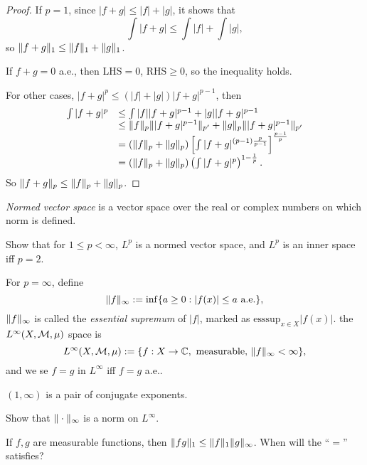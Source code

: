 \begin{proof}
    If $p=1$, since $|f+g|\le|f|+|g|$, it shows that 
    \begin{displaymath}
        \int|f+g|\le\int|f|+\int|g|,
    \end{displaymath}
    so $\|f+g\|_{1}\le\|f\|_{1}+\|g\|_{1}$.

    If $f+g=0$ a.e., then LHS$=0$, RHS$\ge 0$, so the inequality 
    holds. 

    For other cases, $|f+g|^{p}\le(|f|+|g|)|f+g|^{p-1}$, then 
    \begin{displaymath}
        \begin{array}{rl}
            \int|f+g|^{p}&\le \int|f||f+g|^{p-1}+|g||f+g|^{p-1}\\
            &\le\|f\|_{p}\||f+g|^{p-1}\|_{p'}
            +\|g\|_{p}\||f+g|^{p-1}\|_{p'}\\
            &=(\|f\|_{p}+\|g\|_{p})
            \left[\int|f+g|^{(p-1)\frac{p}{p-1}}\right]
            ^{\frac{p-1}{p}}\\
            &=(\|f\|_{p}+\|g\|_{p})
            \left(\int|f+g|^{p}\right)^{1-\frac{1}{p}}.
        \end{array}
    \end{displaymath}
    So $\|f+g\|_{p}\le\|f\|_{p}+\|g\|_{p}$.
\end{proof}
\begin{defn}
    \label{Defn:NVS}
    \textit{Normed vector space} is a vector space 
    over the real or complex numbers on which norm is defined.
\end{defn}
\begin{exc}
    \label{Exc:LpisNVS}
    Show that for $1\le p<\infty$, $L^{p}$ is a normed vector space, 
    and $L^{p}$ is an inner space iff $p=2$.
\end{exc}
\begin{defn}
    For $p=\infty$, define 
    \begin{displaymath}
        \|f\|_{\infty}:=\inf\{a\ge 0:|f(x)|\le a\text{ a.e.}\},
    \end{displaymath}
    $\|f\|_{\infty}$ is called the \textit{essential supremum} of 
    $|f|$, marked as $\text{esssup}_{x\in X}|f(x)|$. 
    the $L^{\infty}(X,\mathcal{M},\mu)$ space is 
    \begin{displaymath}
        L^{\infty}(X,\mathcal{M},\mu):=\{f:X\rightarrow\mathbb{C},
        \text{ measurable, }\|f\|_{\infty}<\infty\},    
    \end{displaymath}
    and we se $f=g$ in $L^{\infty}$ iff $f=g$ a.e..
\end{defn}
\begin{rem}
    $(1,\infty)$ is a pair of conjugate exponents.
\end{rem}
\begin{exc}
    Show that $\|\cdot\|_{\infty}$ is a norm on $L^{\infty}$.
\end{exc}
\begin{exc}
    If $f,g$ are measurable functions, then 
    $\|fg\|_{1}\le\|f\|_{1}\|g\|_{\infty}$. 
    When will the ``$=$'' satisfies?
\end{exc}
